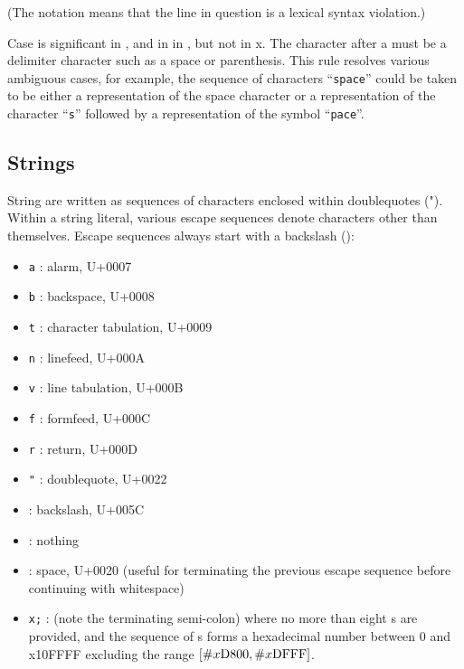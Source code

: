 (The notation  means that the line in question is
a lexical syntax violation.)

Case is significant in \sharpsign\backwhack{}, and in in
\sharpsign{}, %
but not in \sharpsign\backwhack{}x.  
The character after a 
must be a delimiter character such as a
space or parenthesis.  This rule resolves various ambiguous cases, for
example, the sequence of characters ``{\tt\sharpsign\backwhack space}''
could be taken to be either a representation of the space character or a
representation of the character ``{\tt\sharpsign\backwhack s}'' followed
by a representation of the symbol ``{\tt pace}''.

\subsection{Strings}

\vest String are written as sequences of characters enclosed within doublequotes
({\cf "}).  Within a string literal, various escape
sequences denote characters other than
themselves.  Escape sequences always start with a backslash (\backwhack{}):

\begin{itemize}
\item{\tt \backwhack{}a} : alarm, U+0007
\item{\tt \backwhack{}b} : backspace, U+0008 
\item{\tt \backwhack{}t} : character tabulation, U+0009 
\item{\tt \backwhack{}n} : linefeed, U+000A 
\item{\tt \backwhack{}v} : line tabulation, U+000B 
\item{\tt \backwhack{}f} : formfeed, U+000C 
\item{\tt \backwhack{}r} : return, U+000D 
\item{\tt \backwhack{}}\verb|"| : doublequote, U+0022 
\item{\tt \backwhack{}\backwhack{}} : backslash, U+005C 
\item{\tt \backwhack{}} : nothing
\item{\tt \backwhack{}} : space, U+0020 (useful for terminating the
  previous escape sequence before continuing with whitespace)
\item{\tt \backwhack{}x;} : (note the
  terminating semi-colon) where no more than eight s
  are provided, and the sequence of s forms a
  hexadecimal number between 0 and \sharpsign{}x10FFFF excluding the
  range $\left[{\tt\#}{}x\textrm{D800},
    {\tt\#}{}x\textrm{DFFF}\right]$.
\end{itemize}

